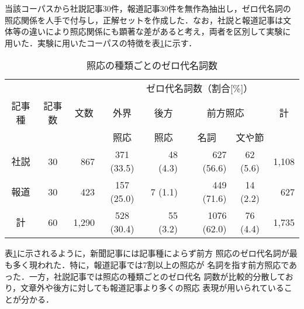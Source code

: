 \noindent
当該コーパスから社説記事30件，報道記事30件を無作為抽出し，ゼロ代名詞の
照応関係を人手で付与し，正解セットを作成した．なお，社説と報道記事は文
体等の違いにより照応関係にも顕著な差があると考え，両者を区別して実験に
用いた．実験に用いたコーパスの特徴を表\ref{tab:statistics}に示す．

\begin{table}[htbp]
  \def\baselinestretch{}
  \begin{center}
    \caption{照応の種類ごとのゼロ代名詞数}
    \label{tab:statistics}
    \medskip \small
    \begin{tabular}{ccr@{\ \ \ \ \ }crrcr}
      \hline\hline
      & & & \multicolumn{5}{c}{ゼロ代名詞数（割合[\%]）}\\
      \cline{4-8}
      記事種 & 記事数 & \multicolumn{1}{c}{文数}& 外界 & \multicolumn{1}{c}{後方} &
      \multicolumn{2}{c}{前方照応} & \multicolumn{1}{c}{計}\\
      \cline{6-7}
      & & & 照応 & \multicolumn{1}{c}{照応} & \multicolumn{1}{c}{名詞} & 文や節 &\\
      \hline
      社説 & 30 & 867 & 371 (33.5) & 48 (4.3) & 627 (56.6) & 62 (5.6) & 1,108\\
      報道 & 30 & 423 & 157 (25.0) & 7 (1.1) & 449 (71.6) & 14 (2.2) & 627\\
      \hline
      計 & 60 & 1,290 & 528 (30.4) & 55 (3.2) & 1076 (62.0) & 76 (4.4) & 1,735\\
      \hline
    \end{tabular}
  \end{center}
\end{table}

表\ref{tab:statistics}に示されるように，新聞記事には記事種によらず前方
照応のゼロ代名詞が最も多く現われた．特に，報道記事では7割以上の照応が
名詞を指す前方照応であった．一方，社説記事では照応の種類ごとのゼロ代名
詞数が比較的分散しており，文章外や後方に対しても報道記事より多くの照応
表現が用いられていることが分かる．

